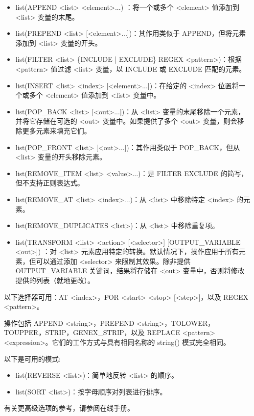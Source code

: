 \begin{itemize}
\item
list(APPEND <list> <element>...) ：将一个或多个 <element> 值添加到 <list> 变量的末尾。

\item
list(PREPEND <list> [<element>...])：其作用类似于 APPEND，但将元素添加到 <list> 变量的开头。

\item
list(FILTER <list> \{INCLUDE | EXCLUDE\} REGEX <pattern>)：根据 <pattern> 值过滤 <list> 变量，以 INCLUDE 或 EXCLUDE 匹配的元素。

\item
list(INSERT <list> <index> [<element>...])：在给定的 <index> 位置将一个或多个 <element> 值添加到 <list> 变量中。

\item
list(POP\_BACK <list> [<out>...])：从 <list> 变量的末尾移除一个元素，并将它存储在可选的 <out> 变量中。如果提供了多个 <out> 变量，则会移除更多元素来填充它们。

\item
list(POP\_FRONT <list> [<out>...])：其作用类似于 POP\_BACK，但从 <list> 变量的开头移除元素。

\item
list(REMOVE\_ITEM <list> <value>...)：是 FILTER EXCLUDE 的简写，但不支持正则表达式。

\item
list(REMOVE\_AT <list> <index>...)：从 <list> 中移除特定 <index> 的元素。

\item
list(REMOVE\_DUPLICATES <list>)：从 <list> 中移除重复项。

\item
list(TRANSFORM <list> <action> [<selector>] [OUTPUT\_VARIABLE <out>]) ：对 <list> 元素应用特定的转换。默认情况下，操作应用于所有元素，但可以通过添加 <selector> 来限制其效果。除非提供 OUTPUT\_VARIABLE 关键词，结果将存储在 <out> 变量中，否则将修改提供的列表（就地更改）。
\end{itemize}

以下选择器可用：AT <index>，FOR <start> <stop> [<step>]，以及 REGEX <pattern>。

操作包括 APPEND <string>，PREPEND <string>，TOLOWER，TOUPPER，STRIP，GENEX\_STRIP，以及 REPLACE <pattern> <expression>。它们的工作方式与具有相同名称的 string() 模式完全相同。


以下是可用的模式:

\begin{itemize}
\item
list(REVERSE <list>)：简单地反转 <list> 的顺序。

\item
list(SORT <list>)：按字母顺序对列表进行排序。
\end{itemize}

有关更高级选项的参考，请参阅在线手册。











